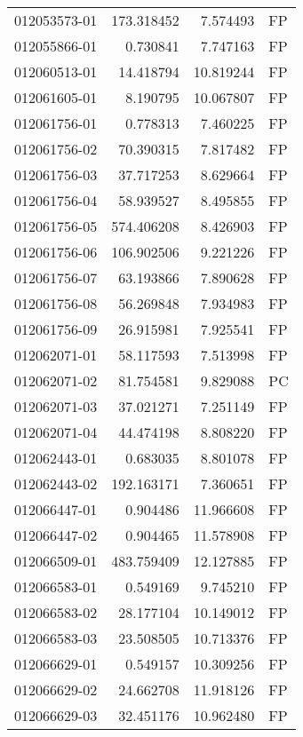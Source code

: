 \begin{tabular}{lrrl}
012053573-01 &  173.318452 &       7.574493 &   FP \\
012055866-01 &    0.730841 &       7.747163 &   FP \\
012060513-01 &   14.418794 &      10.819244 &   FP \\
012061605-01 &    8.190795 &      10.067807 &   FP \\
012061756-01 &    0.778313 &       7.460225 &   FP \\
012061756-02 &   70.390315 &       7.817482 &   FP \\
012061756-03 &   37.717253 &       8.629664 &   FP \\
012061756-04 &   58.939527 &       8.495855 &   FP \\
012061756-05 &  574.406208 &       8.426903 &   FP \\
012061756-06 &  106.902506 &       9.221226 &   FP \\
012061756-07 &   63.193866 &       7.890628 &   FP \\
012061756-08 &   56.269848 &       7.934983 &   FP \\
012061756-09 &   26.915981 &       7.925541 &   FP \\
012062071-01 &   58.117593 &       7.513998 &   FP \\
012062071-02 &   81.754581 &       9.829088 &   PC \\
012062071-03 &   37.021271 &       7.251149 &   FP \\
012062071-04 &   44.474198 &       8.808220 &   FP \\
012062443-01 &    0.683035 &       8.801078 &   FP \\
012062443-02 &  192.163171 &       7.360651 &   FP \\
012066447-01 &    0.904486 &      11.966608 &   FP \\
012066447-02 &    0.904465 &      11.578908 &   FP \\
012066509-01 &  483.759409 &      12.127885 &   FP \\
012066583-01 &    0.549169 &       9.745210 &   FP \\
012066583-02 &   28.177104 &      10.149012 &   FP \\
012066583-03 &   23.508505 &      10.713376 &   FP \\
012066629-01 &    0.549157 &      10.309256 &   FP \\
012066629-02 &   24.662708 &      11.918126 &   FP \\
012066629-03 &   32.451176 &      10.962480 &   FP \\

\end{tabular}
